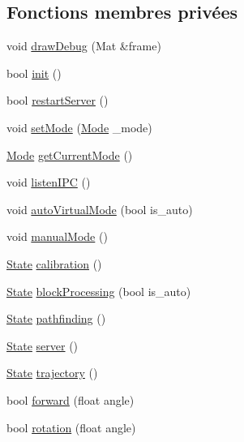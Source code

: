 \subsection*{Fonctions membres privées}
\begin{DoxyCompactItemize}
\item 
void \hyperlink{classCore_ae03caf8d8abe9d4c3b875c6f6a5d40dd}{draw\-Debug} (Mat \&frame)
\item 
bool \hyperlink{classCore_a2ad48b714f575d3f3c25c80ffa72afad}{init} ()
\item 
bool \hyperlink{classCore_a2197457d525b6f0eface1f8712fd2084}{restart\-Server} ()
\item 
void \hyperlink{classCore_a1dac5f63296f11309c2f25770b30912b}{set\-Mode} (\hyperlink{core_8h_a46c8a310cf4c094f8c80e1cb8dc1f911}{Mode} \-\_\-mode)
\item 
\hyperlink{core_8h_a46c8a310cf4c094f8c80e1cb8dc1f911}{Mode} \hyperlink{classCore_a0d0ccf9b40761ed8f88fe1d9a348fc02}{get\-Current\-Mode} ()
\item 
void \hyperlink{classCore_a9677503611528b6d6f2039eff6f80912}{listen\-I\-P\-C} ()
\item 
void \hyperlink{classCore_a7fab8414125602f9f595143bb21d24c1}{auto\-Virtual\-Mode} (bool is\-\_\-auto)
\item 
void \hyperlink{classCore_afcdd1611a6528fd3d597d719405493b4}{manual\-Mode} ()
\item 
\hyperlink{core_8h_a5d74787dedbc4e11c1ab15bf487e61f8}{State} \hyperlink{classCore_a2d832a5e544b5e76d03a7fd596522b42}{calibration} ()
\item 
\hyperlink{core_8h_a5d74787dedbc4e11c1ab15bf487e61f8}{State} \hyperlink{classCore_a8648fac82f0324cead88c8fa2731b286}{block\-Processing} (bool is\-\_\-auto)
\item 
\hyperlink{core_8h_a5d74787dedbc4e11c1ab15bf487e61f8}{State} \hyperlink{classCore_a333060e38c961d6fbf4ba4d01a84e48b}{pathfinding} ()
\item 
\hyperlink{core_8h_a5d74787dedbc4e11c1ab15bf487e61f8}{State} \hyperlink{classCore_a2a8efb95fadd86481ba62c98b72c7f1c}{server} ()
\item 
\hyperlink{core_8h_a5d74787dedbc4e11c1ab15bf487e61f8}{State} \hyperlink{classCore_a185801ec33fe24b0f36e4d9e474403ca}{trajectory} ()
\item 
bool \hyperlink{classCore_a180fe625431721a94959a694fe91ef3f}{forward} (float angle)
\item 
bool \hyperlink{classCore_a0639e803afd1447272759b6b0fa22f60}{rotation} (float angle)
\end{DoxyCompactItemize}
